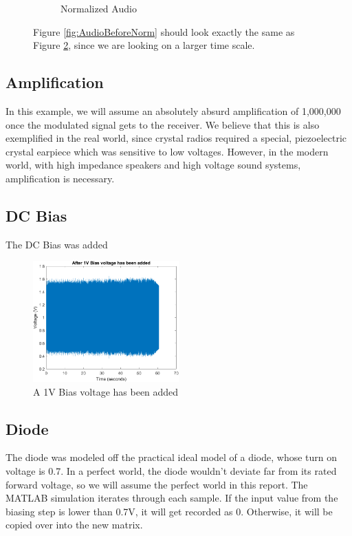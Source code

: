\begin{figure}[H]
\begin{subfigure}[b]{0.48\textwidth}
            \caption{Normalized Audio}
            \label{fig:AudioAfterNorm}
        \end{subfigure}
        \caption{Figure \ref{fig:AudioBeforeNorm} should look exactly the same as Figure \ref{fig:AudioAfterNorm}, since we are looking on a larger time scale.}
    \end{figure}

\subsection{Amplification}
    In this example, we will assume an absolutely absurd amplification of 1,000,000 once the modulated signal gets to the receiver. We believe that this is also exemplified in the real world, since crystal radios required a special, piezoelectric crystal earpiece which was sensitive to low voltages. However, in the modern world, with high impedance speakers and high voltage sound systems, amplification is necessary.

\subsection{DC Bias}
    The DC Bias was added 
    \begin{figure}[H]
        \centering
        \includegraphics[width=0.5\textwidth]{Images/Bias.png}
        \caption{A 1V Bias voltage has been added}
        \label{fig:Bias}
    \end{figure}
\subsection{Diode}
    The diode was modeled off the practical ideal model of a diode, whose turn on voltage is 0.7. In a perfect world, the diode wouldn't deviate far from its rated forward voltage, so we will assume the perfect world in this report. The MATLAB simulation iterates through each sample. If the input value from the biasing step is lower than 0.7V, it will get recorded as 0. Otherwise, it will be copied over into the new matrix.
    
